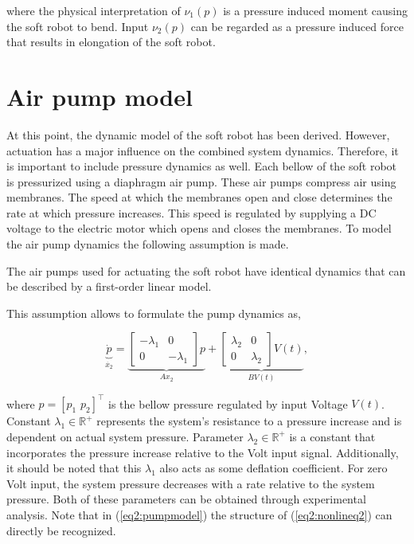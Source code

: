 {where the physical interpretation of $\nu_1(p)$ is a pressure induced moment causing the soft robot to bend. Input $\nu_2(p)$ can be regarded as a pressure induced force that results in elongation of the soft robot.



\section{Air pump model}


At this point, the dynamic model of the soft robot has been derived. However, actuation has a major influence on the combined system dynamics. Therefore, it is important to include pressure dynamics as well. Each bellow of the soft robot is pressurized using a diaphragm air pump. These air pumps compress air using membranes. The speed at which the membranes open and close determines the rate at which pressure increases. This speed is regulated by supplying a DC voltage to the electric motor which opens and closes the membranes. To model the air pump dynamics the following assumption is made.

\begin{theorem}
The air pumps used for actuating the soft robot have identical dynamics that can be described by a first-order linear model.
\end{theorem}

This assumption allows to formulate the pump dynamics as,

\begin{equation}
 \underbrace{\dot{p}}_{\dot{x_2}}  = \underbrace{\begin{bmatrix} -\lambda_1 & 0 \\ 0 & -\lambda_1 \end{bmatrix} p}_{Ax_2} + \underbrace{\begin{bmatrix} \lambda_2 & 0 \\ 0 & \lambda_2 \end{bmatrix} V(t)}_{BV(t)},
    \label{eq2:pumpmodel}
\end{equation}

where $p =  [p_1 \hspace{4pt} p_2]^\top$ is the bellow pressure regulated by input Voltage $V(t)$. Constant $\lambda_1 \in \mathbb{R}^+$ represents the system's resistance to a pressure increase and is dependent on actual system pressure. Parameter $\lambda_2 \in \mathbb{R}^+$ is a constant that incorporates the pressure increase relative to the Volt input signal. Additionally, it should be noted that this $\lambda_1$ also acts as some deflation coefficient. For zero Volt input, the system pressure decreases with a rate relative to the system pressure. Both of these parameters can be obtained through experimental analysis. Note that in (\ref{eq2:pumpmodel}) the structure of (\ref{eq2:nonlineq2}) can directly be recognized. 







}
